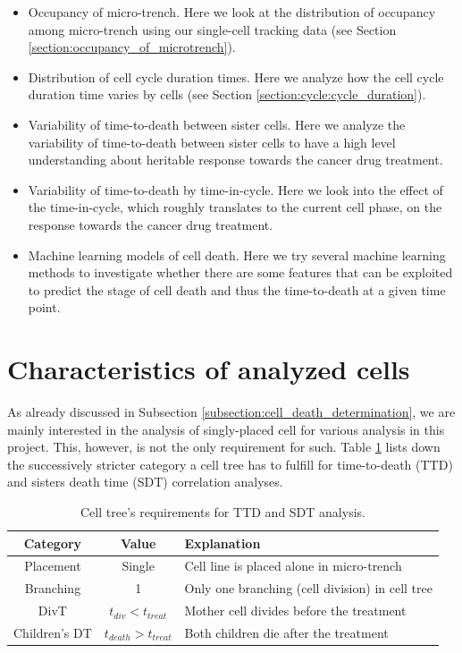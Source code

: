 \documentclass[pdftex,12pt,a4paper]{report}
\begin{document}
\begin{itemize}
\item Occupancy of micro-trench. Here we look at the distribution of occupancy among micro-trench using our single-cell tracking data (see Section \ref{section:occupancy_of_microtrench}).
\item Distribution of cell cycle duration times. Here we analyze how the cell cycle duration time varies by cells (see Section \ref{section:cycle:cycle_duration}).
\item Variability of time-to-death between sister cells. Here we analyze the variability of time-to-death between sister cells to have a high level understanding about heritable response towards the cancer drug treatment.
\item Variability of time-to-death by time-in-cycle.  Here we look into the effect of the time-in-cycle, which roughly translates to the current cell phase, on the response towards the cancer drug treatment.
\item Machine learning models of cell death. Here we try several machine learning methods to investigate whether there are some features that can be exploited to predict the stage of cell death and thus the time-to-death at a given time point.
\end{itemize}

\section{Characteristics of analyzed cells}

As already discussed in Subsection \ref{subsection:cell_death_determination}, we are mainly interested in the analysis of singly-placed cell  for various analysis in this project. This, however, is not the only requirement for such. Table \ref{table:cell_reqs_main} lists down the successively stricter category a cell tree has to fulfill for time-to-death (TTD) and sisters death time (SDT) correlation analyses.

\begin{table}[H]
\centering
\begin{tabular}{ c | c | l }
Category & Value & Explanation \\
\hline
Placement & Single & Cell line is placed alone in micro-trench \\
Branching & 1 & Only one branching (cell division) in cell tree \\
DivT & $t_{div} < t_{treat}$ & Mother cell divides before the treatment\\
Children's DT & $t_{death} > t_{treat}$  & Both children die after the treatment
\end{tabular}
\caption[Cell tree's requirements for TTD and SDT analysis]{Cell tree's requirements for TTD and SDT analysis.}
\label{table:cell_reqs_main}
\end{table}
\end{document}
